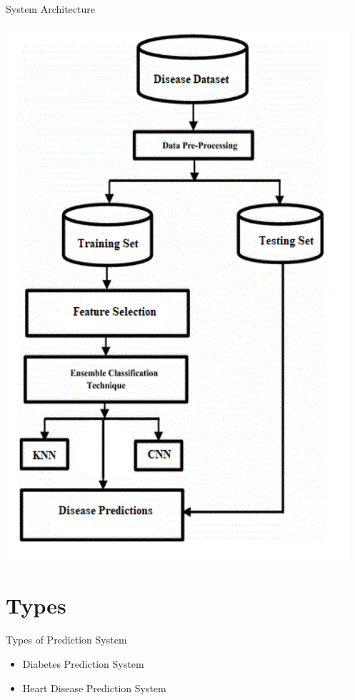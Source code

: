 \documentclass{SKP-beamer}
\begin{document}
\begin{frame}{System Architecture}
	\begin{center}
	\includegraphics[scale=0.48]{1.png}
\end{center}
\end{frame}

\section{\textbf{Types}}

\begin{frame}{Types of Prediction System}
	\begin{itemize}
		\item Diabetes Prediction System
		\item Heart Disease Prediction System			
	\end{itemize}
\end{frame}
\end{document}
